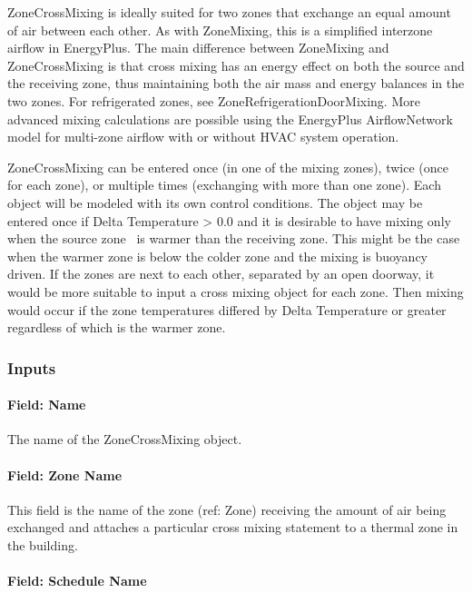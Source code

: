 ZoneCrossMixing is ideally suited for two zones that exchange an equal amount of air between each other. As with ZoneMixing, this is a simplified interzone airflow in EnergyPlus. The main difference between ZoneMixing and ZoneCrossMixing is that cross mixing has an energy effect on both the source and the receiving zone, thus maintaining both the air mass and energy balances in the two zones. For refrigerated zones, see ZoneRefrigerationDoorMixing. More advanced mixing calculations are possible using the EnergyPlus AirflowNetwork model for multi-zone airflow with or without HVAC system operation.

ZoneCrossMixing can be entered once (in one of the mixing zones), twice (once for each zone), or multiple times (exchanging with more than one zone). Each object will be modeled with its own control conditions. The object may be entered once if Delta Temperature \textgreater{} 0.0 and it is desirable to have mixing only when the source zone~ is warmer than the receiving zone. This might be the case when the warmer zone is below the colder zone and the mixing is buoyancy driven. If the zones are next to each other, separated by an open doorway, it would be more suitable to input a cross mixing object for each zone. Then mixing would occur if the zone temperatures differed by Delta Temperature or greater regardless of which is the warmer zone.

\subsubsection{Inputs}\label{inputs-6-003}

\paragraph{Field: Name}\label{field-name-6-003}

The name of the ZoneCrossMixing object.

\paragraph{Field: Zone Name}\label{field-zone-name-4}

This field is the name of the zone (ref: Zone) receiving the amount of air being exchanged and attaches a particular cross mixing statement to a thermal zone in the building.

\paragraph{Field: Schedule Name}\label{field-schedule-name-4}

